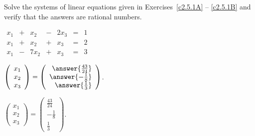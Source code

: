 \documentclass{ximera}
\begin{document}
\noindent Solve the systems of linear equations given in Exercises~\ref{c2.5.1A}
-- \ref{c2.5.1B} and verify that the answers are rational numbers. 
\begin{exercise} \label{c2.5.1A}
\qquad $\begin{array}{rcrcrcr}
         x_1 & + &   x_2 & - &   2x_3 & = & 1 \\
         x_1 & + &   x_2 & + &    x_3 & = & 2 \\
         x_1 & - &  7x_2 & + &    x_3 & = & 3
        \end{array}$
        \begin{prompt}
          $\left(\begin{array}{c} x_1 \\ x_2 \\ x_3\end{array}\right) =
\left(\begin{array}{r} 
\answer{\frac{43}{24}} \\ \answer{-\frac{1}{8}} \\ \answer{\frac{1}{3}} \end{array}\right)$.
        \end{prompt}

\begin{solution}

$\left(\begin{array}{c} x_1 \\ x_2 \\ x_3\end{array}\right) =
\left(\begin{array}{r} 
\frac{43}{24} \\ -\frac{1}{8} \\ \frac{1}{3} \end{array}\right)$.

\end{solution}
\end{exercise}
\end{document}

